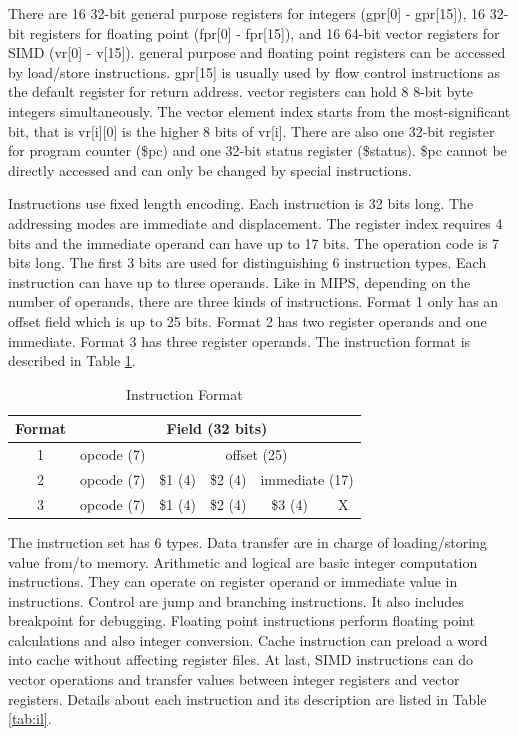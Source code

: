 \documentclass{sig-alternate}
\begin{document}
There are 16 32-bit general purpose registers for integers (gpr[0] - gpr[15]), 16 32-bit registers for floating point (fpr[0] - fpr[15]), and 16 64-bit vector registers for SIMD (vr[0] - v[15]). general purpose and floating point registers can be accessed by load/store instructions. gpr[15] is usually used by flow control instructions as the default register for return address. vector registers can hold 8 8-bit byte integers simultaneously. The vector element index starts from the most-significant bit, that is vr[i][0] is the higher 8 bits of vr[i]. There are also one 32-bit register for program counter (\$pc) and one 32-bit status register (\$status). \$pc cannot be directly accessed and can only be changed by special instructions.

Instructions use fixed length encoding. Each instruction is 32 bits long. The addressing modes are immediate and displacement. The register index requires 4 bits and the immediate operand can have up to 17 bits. The operation code is 7 bits long. The first 3 bits are used for distinguishing 6 instruction types. Each instruction can have up to three operands. Like in MIPS, depending on the number of operands, there are three kinds of instructions. Format 1 only has an offset field which is up to 25 bits. Format 2 has two register operands and one immediate. Format 3 has three register operands. The instruction format is described in Table \ref{tab:if}. 

\begin{table}[!ht]
\caption{Instruction Format}
\label{tab:if}
\centering
\begin{tabular}{|c|c|c|c|c|c|}
\hline
 Format & \multicolumn{5}{c|}{Field (32 bits)}\\
 \hline
1 & opcode (7) & \multicolumn{4}{c|}{offset (25)}\\
\hline
2 & opcode (7) & \$1 (4) & \$2 (4) & \multicolumn{2}{c|}{immediate (17)}\\
\hline
3 & opcode (7) & \$1 (4) & \$2 (4) & \$3 (4) & X\\
\hline
\end{tabular}
\end{table}

The instruction set has 6 types. Data transfer are in charge of loading/storing value from/to memory. Arithmetic and logical are basic integer computation instructions. They can operate on register operand or immediate value in instructions. Control are jump and branching instructions. It also includes breakpoint for debugging. Floating point instructions perform floating point calculations and also integer conversion. Cache instruction can preload a word into cache without affecting register files. At last, SIMD instructions can do vector operations and transfer values between integer registers and vector registers. Details about each instruction and its description are listed in Table \ref{tab:il}.
\end{document}
